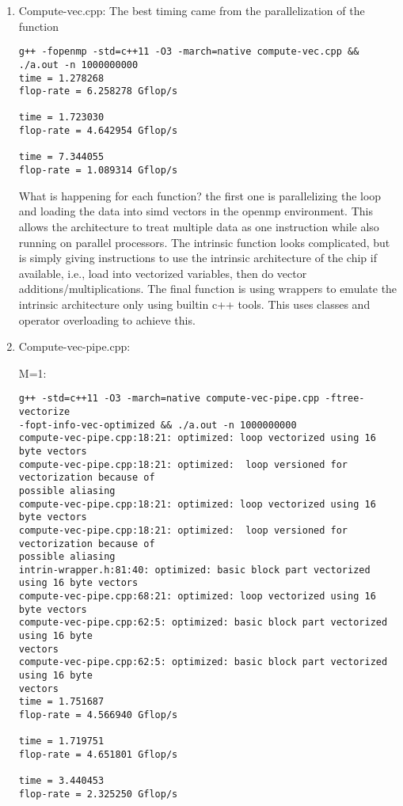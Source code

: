 \documentclass{article}
\begin{document}
\begin{enumerate}
\begin{enumerate}
        \item Compute-vec.cpp:
        The best timing came from the parallelization of the function
        \begin{verbatim}
g++ -fopenmp -std=c++11 -O3 -march=native compute-vec.cpp && ./a.out -n 1000000000
time = 1.278268
flop-rate = 6.258278 Gflop/s

time = 1.723030
flop-rate = 4.642954 Gflop/s

time = 7.344055
flop-rate = 1.089314 Gflop/s

        \end{verbatim}

        What is happening for each function? the first one is parallelizing the loop 
and loading the data into simd vectors in the openmp environment.  This allows the 
architecture to treat multiple data as one instruction while also running on 
parallel processors.  The intrinsic function looks complicated, but is simply giving 
instructions to use the intrinsic architecture of the chip if available, i.e., load 
into vectorized variables, then do vector additions/multiplications.  The final 
function is using wrappers to emulate the intrinsic architecture only using builtin 
c++ tools.  This uses classes and operator overloading to achieve this.

        \item Compute-vec-pipe.cpp:

        M=1:
        \begin{verbatim}
g++ -std=c++11 -O3 -march=native compute-vec-pipe.cpp -ftree-vectorize 
-fopt-info-vec-optimized && ./a.out -n 1000000000
compute-vec-pipe.cpp:18:21: optimized: loop vectorized using 16 byte vectors
compute-vec-pipe.cpp:18:21: optimized:  loop versioned for vectorization because of 
possible aliasing
compute-vec-pipe.cpp:18:21: optimized: loop vectorized using 16 byte vectors
compute-vec-pipe.cpp:18:21: optimized:  loop versioned for vectorization because of 
possible aliasing
intrin-wrapper.h:81:40: optimized: basic block part vectorized using 16 byte vectors
compute-vec-pipe.cpp:68:21: optimized: loop vectorized using 16 byte vectors
compute-vec-pipe.cpp:62:5: optimized: basic block part vectorized using 16 byte 
vectors
compute-vec-pipe.cpp:62:5: optimized: basic block part vectorized using 16 byte 
vectors
time = 1.751687
flop-rate = 4.566940 Gflop/s

time = 1.719751
flop-rate = 4.651801 Gflop/s

time = 3.440453
flop-rate = 2.325250 Gflop/s


\end{verbatim}
\end{enumerate}
\end{enumerate}
\end{document}
